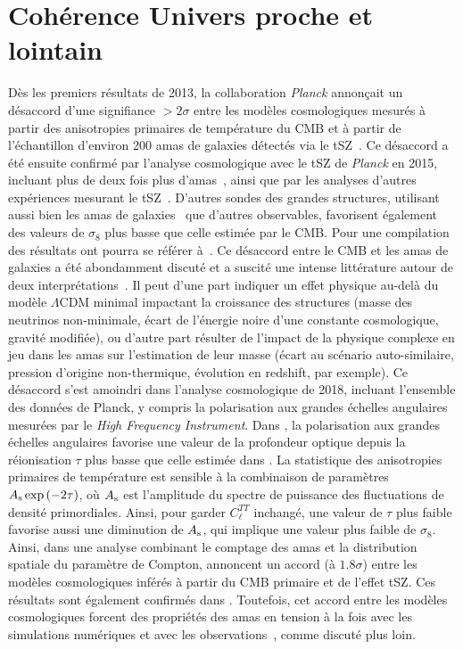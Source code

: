 \section{Cohérence Univers proche et lointain}
\label{se:cosmo_tensions}

Dès les premiers résultats de 2013, la
collaboration \emph{Planck} annonçait un désaccord
d'une signifiance $>2\sigma$ entre les modèles cosmologiques mesurés
à partir des anisotropies primaires de température du CMB et à partir de
l'échantillon d'environ 200 amas de galaxies détectés via le
tSZ~\citep{Planck_2014_SZ_Cosmo, Planck_2014_ymap}. Ce désaccord a été
ensuite confirmé par l'analyse cosmologique avec le tSZ
de \emph{Planck} en 2015, incluant plus de deux fois plus
d'amas~\citep{Planck_2016_SZ_cosmo, Planck2016_ymap}, ainsi que par
les analyses d'autres expériences mesurant le
tSZ~\citep[\emph{e.g.}][]{Hasselfield2013_ACT_SZ,
deHaan2016}. D'autres sondes des grandes structures, utilisant aussi
bien les amas de galaxies~\citep[\emph{e.g.}][]{Bohringer2014,
Pacaud2018} que d'autres observables, favorisent également des valeurs
de $\sigma_8$ plus basse que celle estimée par le CMB. Pour une
compilation des résultats ont pourra se référer à~\citet{Salvati2018}.
Ce désaccord entre le CMB et les amas de galaxies a été
abondamment discuté et a suscité une intense littérature autour de
deux interprétations~\citep[voir \emph{e.g.}][pour un
résumé]{Planck_2016_SZ_cosmo, Salvati2018}. Il peut d'une part
indiquer un effet physique au-delà du modèle $\Lambda$CDM minimal
impactant la croissance des structures (masse des neutrinos
non-minimale, écart de l'énergie noire d'une constante cosmologique,
gravité modifiée), ou d'autre part résulter de l'impact de la
physique complexe en jeu dans les amas sur l'estimation de leur masse
(écart au scénario auto-similaire, pression d'origine non-thermique,
évolution en redshift, par exemple). Ce désaccord s'est amoindri dans
l'analyse cosmologique de 2018, incluant l'ensemble des données de
Planck, y compris la polarisation aux grandes échelles angulaires
mesurées par le \emph{High Frequency
Instrument}. Dans \citet{Planck_2018_cosmo}, la polarisation aux
grandes échelles angulaires favorise une valeur de la profondeur
optique depuis la réionisation $\tau$ plus basse que celle estimée
dans \citet{Planck_2016_cosmo}. La statistique des anisotropies
primaires de température est sensible à la combinaison de paramètres
$A_{\rm{s}} \exp{(-2\tau)}$, où $A_{\rm{s}}$ est l'amplitude du spectre
de puissance des fluctuations de densité primordiales. Ainsi, pour
garder $C_\ell^{TT}$ inchangé, une valeur de $\tau$ plus faible
favorise aussi une diminution de $A_{\rm{s}}$, qui implique une valeur
plus faible de $\sigma_8$. Ainsi, dans une analyse combinant le
comptage des amas et la distribution spatiale du paramètre de
Compton, \citet{Salvati2018} annoncent un accord (à $1.8\sigma$) entre
les modèles cosmologiques inférés à partir du CMB primaire et de
l'effet tSZ. Ces résultats sont également confirmés
dans \citet{Zulbedia2019}. Toutefois, cet accord entre les modèles
cosmologiques forcent des propriétés des amas en tension à
la fois avec les simulations numériques et avec les
observations~\citep{Salvati2018}, comme discuté plus loin. 


